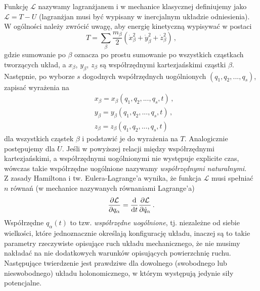 \documentclass[../main.tex]{subfiles}
\begin{document}
\noindent{}
\medskip

Funkcję \(\mathcal{L}\) nazywamy lagranżjanem i w mechanice klasycznej definiujemy jako
\(\mathcal{L}=T-U\) (lagranżjan musi być wypisany w inercjalnym układzie odniesienia). W ogólności
należy zwrócić uwagę, aby energię kinetyczną wypisywać w postaci
\begin{equation*}
    T=\sum_\beta \frac{m_\beta}{2}(\dot{x}_\beta^2+\dot{y}_\beta^2+\dot{z}_\beta^2)\,,
\end{equation*}
gdzie sumowanie po \(\beta\) oznacza po prostu sumowanie po wszystkich cząstkach tworzących układ, a
\(x_\beta\), \(y_\beta\), \(z_\beta\) są współrzędnymi kartezjańskimi cząstki \(\beta\). Następnie,
po wyborze \(s\) dogodnych współrzędnych uogólnionych \((q_1,q_2,...,q_s)\), zapisać wyrażenia na
\begin{equation*}
\begin{split}
    &x_\beta=x_\beta(q_1,q_2,...,q_s,t)\,,\\
    &y_\beta=y_\beta(q_1,q_2,...,q_s,t)\,,\\
    &z_\beta=z_\beta(q_1,q_2,...,q_s,t)
\end{split}
\end{equation*}
dla wszystkich cząstek \(\beta\) i podstawić je do wyrażenia na \(T\). Analogicznie postępujemy dla
\(U\). Jeśli w powyższej relacji między współrzędnymi kartezjańskimi, a współrzędnymi uogólnionymi
nie występuje explicite czas, wówczas takie współrzędne uogólnione nazywamy \textit{współrzędnymi
naturalnymi}.\\
Z zasady Hamiltona i tw. Eulera-Lagrange'a wynika, że funkcja \(\mathcal{L}\) musi spełniać \(n\)
równań (w mechanice nazywanych równaniami Lagrange'a)
\begin{equation*}
    \frac{\partial\mathcal{L}}{\partial q_\alpha}=\dv{}{t}\frac{\partial \mathcal{L}}{\partial \dot{q}_\alpha}\,.
\end{equation*}
Współrzędne \(q_\alpha(t)\) to tzw. \textit{współrzędne uogólnione}, tj. niezależne od siebie
wielkości, które jednoznacznie określają konfigurację układu, inaczej są to takie parametry
rzeczywiste opisujące ruch układu mechanicznego, że nie musimy nakładać na nie dodatkowych warunków
opisujących powierzchnię ruchu. Następujące twierdzenie jest prawdziwe dla dowolnego (swobodnego lub
nieswobodnego) układu holonomicznego, w którym występują jedynie siły potencjalne.
\medskip
\end{document}
